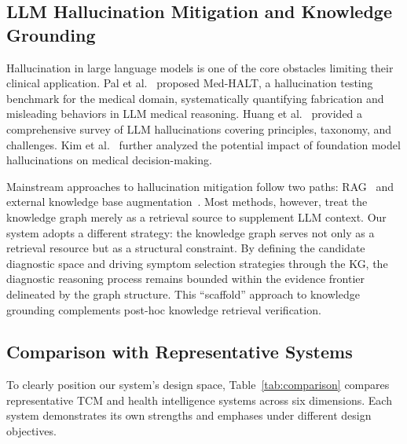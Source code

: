 \documentclass[12pt]{article}
\begin{document}
\subsection{LLM Hallucination Mitigation and Knowledge Grounding}

Hallucination in large language models is one of the core obstacles limiting their clinical application. Pal et al.~\cite{13} proposed Med-HALT, a hallucination testing benchmark for the medical domain, systematically quantifying fabrication and misleading behaviors in LLM medical reasoning. Huang et al.~\cite{44} provided a comprehensive survey of LLM hallucinations covering principles, taxonomy, and challenges. Kim et al.~\cite{45} further analyzed the potential impact of foundation model hallucinations on medical decision-making.

Mainstream approaches to hallucination mitigation follow two paths: RAG~\cite{29} and external knowledge base augmentation~\cite{68}. Most methods, however, treat the knowledge graph merely as a retrieval source to supplement LLM context. Our system adopts a different strategy: the knowledge graph serves not only as a retrieval resource but as a structural constraint. By defining the candidate diagnostic space and driving symptom selection strategies through the KG, the diagnostic reasoning process remains bounded within the evidence frontier delineated by the graph structure. This ``scaffold'' approach to knowledge grounding complements post-hoc knowledge retrieval verification.

\subsection{Comparison with Representative Systems}

To clearly position our system's design space, Table~\ref{tab:comparison} compares representative TCM and health intelligence systems across six dimensions. Each system demonstrates its own strengths and emphases under different design objectives.

\begin{table}[htbp]
\centering
\caption{Comparison of representative TCM intelligent systems}\label{tab:comparison}
\end{table}
\end{document}
